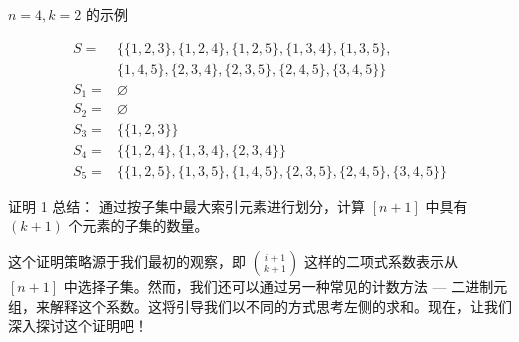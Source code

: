 $n = 4, k = 2$ 的示例

\begin{align*}
    S =   & \Big\{\{1, 2, 3\}, \{1, 2, 4\}, \{1, 2, 5\}, \{1, 3, 4\}, \{1, 3, 5\},                    \\
          & \{1, 4, 5\}, \{2, 3, 4\}, \{2, 3, 5\}, \{2, 4, 5\}, \{3, 4, 5\}\Big\}                     \\
    S_1 = & \varnothing                                                                               \\
    S_2 = & \varnothing                                                                               \\
    S_3 = & \Big\{\{1, 2, 3\} \Big\}                                                                  \\
    S_4 = & \Big\{\{1, 2, 4\}, \{1, 3, 4\}, \{2, 3, 4\} \Big\}                                        \\
    S_5 = & \Big\{\{1, 2, 5\}, \{1, 3, 5\}, \{1, 4, 5\}, \{2, 3, 5\}, \{2, 4, 5\}, \{3, 4, 5\} \Big\}
\end{align*}

\begin{questions}{证明 1 总结：}
    通过按子集中最大索引元素进行划分，计算 $[n+1]$ 中具有 $(k+1)$ 个元素的子集的数量。
\end{questions}

这个证明策略源于我们最初的观察，即 ${i+1 \choose k+1}$ 这样的二项式系数表示从 $[n + 1]$ 中选择子集。然而，我们还可以通过另一种常见的计数方法 --- 二进制元组，来解释这个系数。这将引导我们以不同的方式思考左侧的求和。现在，让我们深入探讨这个证明吧！

